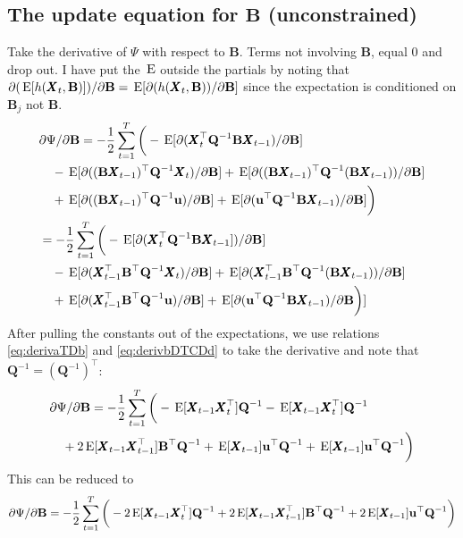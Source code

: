 \documentclass[]{article}
\def\UPS{\mbox{\boldmath $\Upsilon$}}
\def\BB{\mbox{$\mathbf B$}}	\def\bb{\mbox{$\mathbf b$}} \def\Bb{\mbox{$\mathbf J$}} \def\Ba{\mbox{$\mathbf L$}} \def\Bm{\UPS}
\def\E{\,\textup{\textrm{E}}}
\def\QQ{\mbox{$\mathbf Q$}}	 \def\qq{\mbox{$\mathbf q$}} \def\Qb{\mbox{$\mathbf G$}}  \def\Qm{\mathbb{Q}}
\def\XX{\mbox{$\pmb{X}$}}	\def\xx{\mbox{$\pmb{x}$}}
\begin{document}
\subsection{The update equation for $\BB$ (unconstrained)}
Take the derivative of $\Psi$ with respect to $\BB$.  Terms not involving $\BB$, equal 0 and drop out.  I have put the $\E$ outside the partials by noting that $\partial(\E[h(\XX_t,\BB)])/\partial\BB=\E[\partial(h(\XX_t,\BB))/\partial\BB]$ since the expectation is conditioned on $\BB_j$ not $\BB$. 
\begin{equation}\label{eq:B.unconstrained1}
\begin{split}
&\partial\Psi/\partial\BB = -\frac{1}{2} \sum_{t=1}^T\bigg(-\E[\partial(\XX_t^\top\QQ^{-1}\BB\XX_{t-1})/\partial\BB] \\
&\quad - \E[\partial((\BB\XX_{t-1})^\top\QQ^{-1}\XX_t)/\partial\BB] + \E[\partial((\BB\XX_{t-1})^\top\QQ^{-1}(\BB\XX_{t-1}))/\partial\BB] \\
&\quad +  \E[\partial((\BB\XX_{t-1})^\top\QQ^{-1}\uu)/\partial\BB] 
+ \E[\partial(\uu^\top\QQ^{-1}\BB\XX_{t-1})/\partial\BB]\bigg)\\
&= -\frac{1}{2} \sum_{t=1}^T\bigg(-\E[\partial(\XX_t^\top\QQ^{-1}\BB\XX_{t-1}])/\partial\BB] \\
&\quad - \E[\partial(\XX_{t-1}^\top\BB^\top\QQ^{-1}\XX_t)/\partial\BB] 
+ \E[\partial(\XX_{t-1}^\top\BB^\top\QQ^{-1}(\BB\XX_{t-1}))/\partial\BB] \\
&\quad +  \E[\partial(\XX_{t-1}^\top\BB^\top\QQ^{-1}\uu)/\partial\BB] 
+ \E[\partial(\uu^\top\QQ^{-1}\BB\XX_{t-1})/\partial\BB\bigg)]\\
\end{split}
\end{equation}
After pulling the constants out of the expectations, we use relations \ref{eq:derivaTDb} and \ref{eq:derivbDTCDd} to take the derivative and note that $\QQ^{-1} = (\QQ^{-1})^\top$:
\begin{equation}\label{eq:B.unconstrained2}
\begin{split}
&\partial\Psi/\partial\BB = -\frac{1}{2} \sum_{t=1}^T\bigg(-\E[\XX_{t-1}\XX_t^\top]\QQ^{-1} - \E[ \XX_{t-1}\XX_t^\top]\QQ^{-1} \\
&\quad + 2 \E[\XX_{t-1}\XX_{t-1}^\top]\BB^\top\QQ^{-1} + \E[\XX_{t-1}]\uu^\top\QQ^{-1}  + \E[\XX_{t-1}]\uu^\top\QQ^{-1} \bigg) \\
\end{split}
\end{equation}
This can be reduced to
\begin{equation}\label{eq:B.unconstrained3}
\partial\Psi/\partial\BB = -\frac{1}{2} \sum_{t=1}^T\bigg(-2\E[\XX_{t-1}\XX_t^\top]\QQ^{-1}  + 2 \E[\XX_{t-1}\XX_{t-1}^\top ]\BB^\top\QQ^{-1} 
+ 2\E[\XX_{t-1}]\uu^\top\QQ^{-1} \bigg)
\end{equation}
\end{document}
